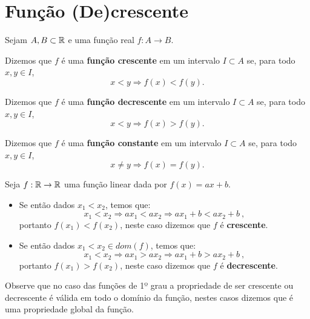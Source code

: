 \section{Função (De)crescente}

\begin{obs}
  Sejam $A, B \subset \mathbb{R}$ e uma função real $f: A \rightarrow B$.

  Dizemos que $f$ é uma \textbf{função crescente} em um intervalo $I \subset A$ se, para todo $x, y \in I$,
\begin{equation*}
 x < y \Rightarrow f(x) < f(y).
\end{equation*}

  Dizemos que $f$ é uma \textbf{função decrescente} em um intervalo $I \subset A$ se, para todo $x, y \in I$,
\begin{equation*}
x < y \Rightarrow f(x) > f(y).
\end{equation*}

  Dizemos que $f$ é uma \textbf{função constante} em um intervalo $I \subset A$ se, para todo $x, y \in I$,
\begin{equation*}
x \neq y \Rightarrow f(x) = f(y).
\end{equation*}
\end{obs}

 Seja $f: \mathbb{R} \to \mathbb{R}$ uma função linear dada por $f(x)= ax + b$.

\begin{itemize}
    \item Se  então dados $x_1 < x_2$, temos que:
\begin{equation*}
x_1 < x_2 \Rightarrow ax_1 < ax_2 \Rightarrow ax_1 + b < ax_2 + b \ ,
\end{equation*}
  portanto $f(x_1) < f(x_2)$, neste caso dizemos que $f$ é \textbf{crescente}.

 \item Se  então  dados $x_1 < x_2 \in dom(f)$, temos que:
\begin{equation*}
x_1 < x_2 \Rightarrow ax_1 > ax_2 \Rightarrow ax_1 + b > ax_2 + b \ ,
\end{equation*}
 portanto $f(x_1) > f(x_2)$, neste caso dizemos que $f$ é \textbf{decrescente}.
 \end{itemize}

 Observe que no caso das funções de 1º grau a propriedade de ser crescente ou decrescente é válida em todo o domínio da função, nestes casos dizemos que é uma propriedade global da função.


